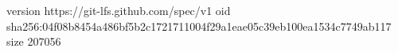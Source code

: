 version https://git-lfs.github.com/spec/v1
oid sha256:04f08b8454a486bf5b2c1721711004f29a1eae05c39eb100ea1534c7749ab117
size 207056
